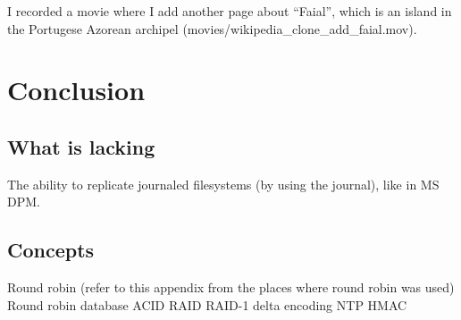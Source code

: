 \documentclass[12pt]{report}
\begin{document}
I recorded a movie where I add another page about ``Faial'', which is
an island in the Portugese Azorean archipel (movies/wikipedia\_clone\_add\_faial.mov).

\chapter{Conclusion} %
\section{What is lacking}
The ability to replicate journaled filesystems (by using the journal),
like in MS DPM.

\begin{appendices}
\chapter{Concepts}
Round robin (refer to this appendix from the places where round robin
was used)
Round robin database
ACID
RAID
RAID-1
delta encoding
NTP
HMAC
\end{appendices}




{}


\end{document}
